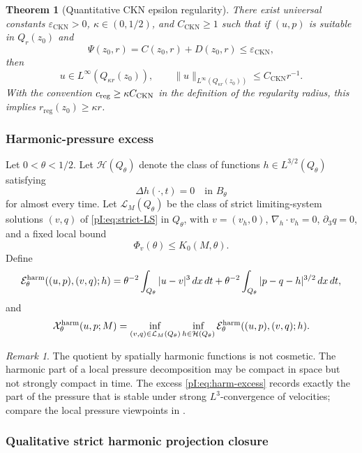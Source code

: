 \documentclass[11pt]{article}
\numberwithin{equation}{section}
\theoremstyle{plain}
\newtheorem{theorem}{Theorem}[section]
\theoremstyle{definition}
\theoremstyle{remark}
\newtheorem{remark}{Remark}[section]
\newcommand{\eps}{\varepsilon}
\newcommand{\reg}{\mathrm{reg}}
\newcommand{\CKN}{\mathrm{CKN}}
\newcommand{\divh}{\nabla_h\!\cdot}
\newcommand{\calE}{\mathcal E}
\newcommand{\calH}{\mathcal H}
\newcommand{\calL}{\mathcal L}
\newcommand{\calX}{\mathcal X}
\begin{document}
\begin{theorem}[Quantitative CKN epsilon regularity]\label{pI:thm:CKN}
There exist universal constants \(\eps_{\CKN}>0\), \(\kappa\in(0,1/2)\), and \(C_{\CKN}\ge1\) such that if \((u,p)\) is suitable in \(Q_r(z_0)\) and
\[
        \Psi(z_0,r)=C(z_0,r)+D(z_0,r)\le \eps_{\CKN},
\]
then
\[
        u\in L^\infty(Q_{\kappa r}(z_0)),
        \qquad
        \|u\|_{L^\infty(Q_{\kappa r}(z_0))}\le C_{\CKN}r^{-1}.
\]
With the convention \(c_{\rm reg}\ge\kappa C_{\CKN}\) in the definition of the regularity radius, this implies \(r_{\reg}(z_0)\ge\kappa r\).
\end{theorem}

\subsubsection{Harmonic-pressure excess}
\label{pI:subsec:harmonic-excess}

Let \(0<\theta<1/2\).  Let \(\calH(Q_\theta)\) denote the class of functions \(h\in L^{3/2}(Q_\theta)\) satisfying
\[
        \Delta h(\cdot,t)=0\quad\text{in }B_\theta
\]
for almost every time.  Let \(\calL_M(Q_\theta)\) be the class of strict limiting-system solutions \((v,q)\) of \eqref{pI:eq:strict-LS} in \(Q_\theta\), with \(v=(v_h,0)\), \(\divh v_h=0\), \(\partial_3q=0\), and a fixed local bound
\[
        \Phi_v(\theta)\le K_0(M,\theta).
\]
Define
\[
\calE^{\rm harm}_\theta((u,p),(v,q);h)
=\theta^{-2}\int_{Q_\theta}|u-v|^3\,dx\,dt
+\theta^{-2}\int_{Q_\theta}|p-q-h|^{3/2}\,dx\,dt,
\]
and
\begin{equation}\label{pI:eq:harm-excess}
\calX^{\rm harm}_\theta(u,p;M)
=
\inf_{(v,q)\in\calL_M(Q_\theta)}
\inf_{h\in\calH(Q_\theta)}
\calE^{\rm harm}_\theta((u,p),(v,q);h).
\end{equation}

\begin{remark}
The quotient by spatially harmonic functions is not cosmetic.  The harmonic part of a local pressure decomposition may be compact in space but not strongly compact in time.  The excess \eqref{pI:eq:harm-excess} records exactly the part of the pressure that is stable under strong \(L^3\)-convergence of velocities; compare the local pressure viewpoints in \cite{SohrWahl1986,SereginSverak2002,Seregin2015,Wolf2017}.
\end{remark}

\subsubsection{Qualitative strict harmonic projection closure}
\end{document}
